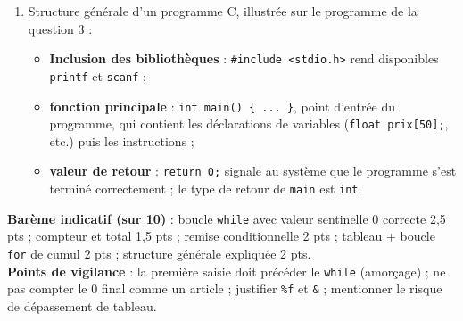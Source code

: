 \documentclass[11pt]{article}
\begin{document}
\begin{corrige}
\begin{enumerate}
\begin{lstlisting}[language=C]
    printf("Nombre d'articles : %d\n", nb);
    printf("Montant total : %.0f FCFA\n", total);
    return 0;
}
\end{lstlisting}
\emph{Attention} : la condition \texttt{nb < 50} empêche le dépassement des 50 cases du tableau (indices 0 à 49). La variable \texttt{nb} compte exactement le nombre d'articles valides, ce qui simplifie la boucle de sommation \texttt{for (i=0; i<nb; i++)}.
\item Structure générale d'un programme C, illustrée sur le programme de la question 3 :
\begin{itemize}
\item \textbf{Inclusion des bibliothèques} : \texttt{\#include <stdio.h>} rend disponibles \texttt{printf} et \texttt{scanf} ;
\item \textbf{fonction principale} : \texttt{int main() \{ ... \}}, point d'entrée du programme, qui contient les déclarations de variables (\texttt{float prix[50];}, etc.) puis les instructions ;
\item \textbf{valeur de retour} : \texttt{return 0;} signale au système que le programme s'est terminé correctement ; le type de retour de \texttt{main} est \texttt{int}.
\end{itemize}
\end{enumerate}
\textbf{Barème indicatif (sur 10)} : boucle \texttt{while} avec valeur sentinelle 0 correcte 2,5 pts ; compteur et total 1,5 pts ; remise conditionnelle 2 pts ; tableau + boucle \texttt{for} de cumul 2 pts ; structure générale expliquée 2 pts.\\
\textbf{Points de vigilance} : la première saisie doit précéder le \texttt{while} (amorçage) ; ne pas compter le 0 final comme un article ; justifier \texttt{\%f} et \texttt{\&} ; mentionner le risque de dépassement de tableau.
\end{corrige}
\end{document}
